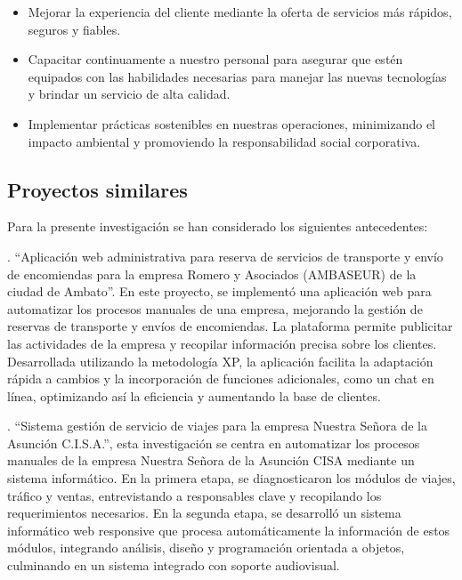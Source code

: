	\begin{itemize}[label=$\bullet$, left=0cm, labelsep = 1.05cm, topsep = 0pt, parsep = 0pt]
		
		\item Mejorar la experiencia del cliente mediante la oferta de servicios más rápidos, seguros y fiables.
		
		\item Capacitar continuamente a nuestro personal para asegurar que estén equipados con las habilidades necesarias para manejar las nuevas tecnologías y brindar un servicio de alta calidad.
		
		\item Implementar prácticas sostenibles en nuestras operaciones, minimizando el impacto ambiental y promoviendo la responsabilidad social corporativa.
		
	\end{itemize}	
	
	\subsection{Proyectos similares}
	
	Para la presente investigación se han considerado los siguientes antecedentes:
	
	\textcite{hurtado2019aplicacion}. ``Aplicación web administrativa para reserva de servicios de transporte y envío de encomiendas para la empresa Romero y Asociados (AMBASEUR) de la ciudad de Ambato''. En este proyecto, se implementó una aplicación web para automatizar los procesos manuales de una empresa, mejorando la gestión de reservas de transporte y envíos de encomiendas. La plataforma permite publicitar las actividades de la empresa y recopilar información precisa sobre los clientes. Desarrollada utilizando la metodología XP, la aplicación facilita la adaptación rápida a cambios y la incorporación de funciones adicionales, como un chat en línea, optimizando así la eficiencia y aumentando la base de clientes.
	
	\textcite{mora2022sistema}. ``Sistema gestión de servicio de viajes para la empresa Nuestra Señora de la Asunción C.I.S.A.'', esta investigación se centra en automatizar los procesos manuales de la empresa Nuestra Señora de la Asunción CISA mediante un sistema informático. En la primera etapa, se diagnosticaron los módulos de viajes, tráfico y ventas, entrevistando a responsables clave y recopilando los requerimientos necesarios. En la segunda etapa, se desarrolló un sistema informático web responsive que procesa automáticamente la información de estos módulos, integrando análisis, diseño y programación orientada a objetos, culminando en un sistema integrado con soporte audiovisual.
	
